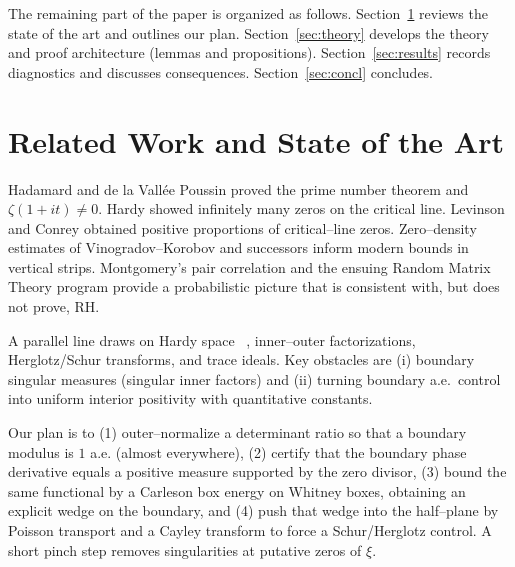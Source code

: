 \documentclass[11pt]{article}
\theoremstyle{definition}
\theoremstyle{remark}
\begin{document}
The remaining part of the paper is organized as follows. 
Section~\ref{sec:soa} reviews the state of the art and outlines our plan.
Section~\ref{sec:theory} develops the theory and proof architecture (lemmas and propositions).
Section~\ref{sec:results} records diagnostics and discusses consequences.
Section~\ref{sec:concl} concludes.



\vspace{1.0cm}
\section{Related Work and State of the Art}
\label{sec:soa}
Hadamard and de la Vallée Poussin proved the prime number theorem and $\zeta(1+it)\neq 0$.
Hardy showed infinitely many zeros on the critical line.
Levinson and Conrey obtained positive proportions of critical--line zeros.
Zero--density estimates of Vinogradov--Korobov and successors inform modern bounds in vertical strips.
Montgomery's pair correlation and the ensuing Random Matrix Theory program provide a probabilistic picture
that is consistent with, but does not prove, RH.


A parallel line draws on Hardy space ~\cite{DurenHp,Hoffman}, inner--outer factorizations,
Herglotz/Schur transforms, and trace ideals.
Key obstacles are (i) boundary singular measures (singular inner factors) and (ii) turning
boundary a.e.\ control into uniform interior positivity with quantitative constants.

Our plan is to
(1) outer--normalize a determinant ratio so that a boundary modulus is $1$ a.e. (almost everywhere),
(2) certify that the boundary phase derivative equals a positive measure supported by the zero divisor,
(3) bound the same functional by a Carleson box energy on Whitney boxes, obtaining an explicit wedge on the boundary, and
(4) push that wedge into the half--plane by Poisson transport and a Cayley transform to force a Schur/Herglotz control.
A short pinch step removes singularities at putative zeros of $\xi$.
\end{document}
